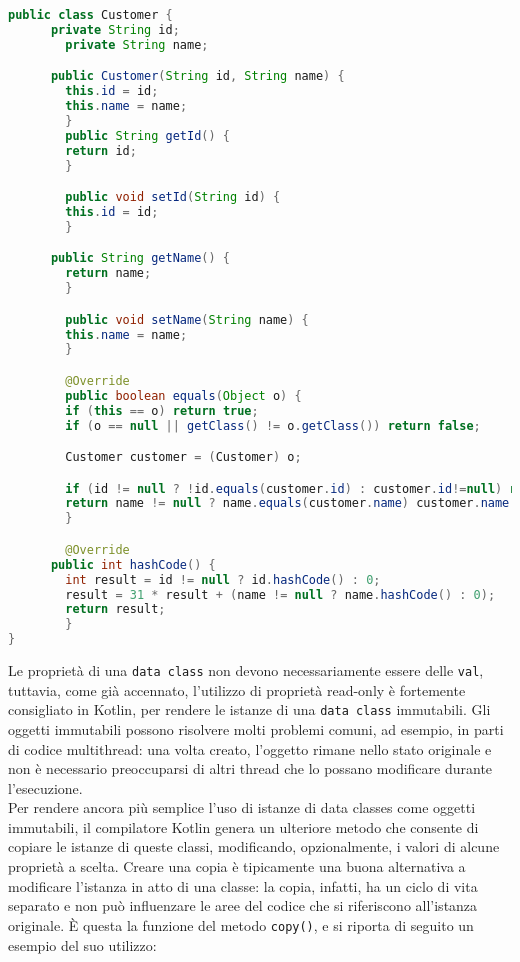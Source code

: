 \begin{lstlisting}[caption={Data Class corrispondente scritta in Java}, captionpos=b, label={lst:exampleDataClassJava}, language=Java]
public class Customer {
   	  private String id;
    	private String name;

      public Customer(String id, String name) {
        this.id = id;
        this.name = name;
    	}
    	public String getId() {
        return id;
    	}

    	public void setId(String id) {
        this.id = id;
    	}

   	  public String getName() {
        return name;
    	}

    	public void setName(String name) {
        this.name = name;
    	}

    	@Override
    	public boolean equals(Object o) {
        if (this == o) return true;
        if (o == null || getClass() != o.getClass()) return false;

        Customer customer = (Customer) o;

        if (id != null ? !id.equals(customer.id) : customer.id!=null) return false;
        return name != null ? name.equals(customer.name) customer.name == null;
    	}

    	@Override
   	  public int hashCode() {
        int result = id != null ? id.hashCode() : 0;
        result = 31 * result + (name != null ? name.hashCode() : 0);
        return result;
    	}
}
\end{lstlisting}

Le proprietà di una \texttt{data class} non devono necessariamente essere delle \texttt{val}, tuttavia, come già accennato, l’utilizzo di proprietà read-only è fortemente consigliato in Kotlin, per rendere le istanze di una \texttt{data class} immutabili. Gli oggetti immutabili possono risolvere molti problemi comuni, ad esempio, in parti di codice multithread: una volta creato, l’oggetto rimane nello stato originale e non è necessario preoccuparsi di altri thread che lo possano modificare durante l’esecuzione.\\
Per rendere ancora più semplice l'uso di istanze di data classes come oggetti immutabili, il compilatore Kotlin genera un ulteriore metodo che consente di copiare le istanze di queste classi, modificando, opzionalmente, i valori di alcune proprietà a scelta. Creare una copia è tipicamente una buona alternativa a modificare l'istanza in atto di una classe: la copia, infatti, ha un ciclo di vita separato e non può influenzare le aree del codice che si riferiscono all'istanza originale. È questa la funzione del metodo \texttt{copy()}, e si riporta di seguito un esempio del suo utilizzo:\\
\\

